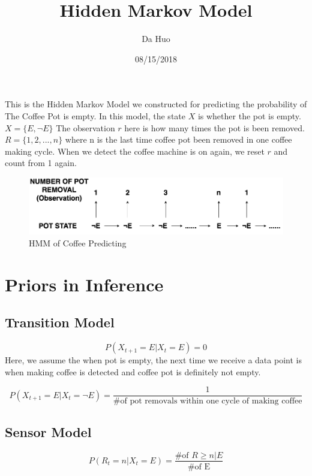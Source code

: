 \documentclass[12pt]{article}
\title{Hidden Markov Model}
\author{Da Huo}
\date{08/15/2018}
\begin{document}
\maketitle

This is the Hidden Markov Model we constructed for predicting the probability of The Coffee Pot is empty. In this model, the state $X$ is whether the pot is empty. $X=\{E,\neg E\}$ The observation $r$ here is how many times the pot is been removed. $R=\{1,2,...,n\}$ where n is the last time coffee pot been removed in one coffee making cycle. When we detect the coffee machine is on again, we reset $r$ and count from 1 again.

\begin{figure}[!htbp]
\center
\includegraphics[scale=0.4]{figure0}
\caption{HMM of Coffee Predicting}
\end{figure}

\section*{Priors in Inference}

\subsection*{Transition Model}

\begin{equation}
P(X_{t+1}=E|X_{t}=E)=0
\end{equation}
Here, we assume the when pot is empty, the next time we receive a data point is when making coffee is detected and coffee pot is definitely not empty.

\begin{equation}
P(X_{t+1}=E|X_{t}=\neg E)=\frac{1}{\text{\# of pot removals within one cycle of making coffee}}
\end{equation}

\subsection*{Sensor Model}
\begin{equation}
P(R_{t}=n|X_{t}=E)=\frac{\text{\# of } R \geq n|E}{\text{\# of E}}
\end{equation}
\end{document}
